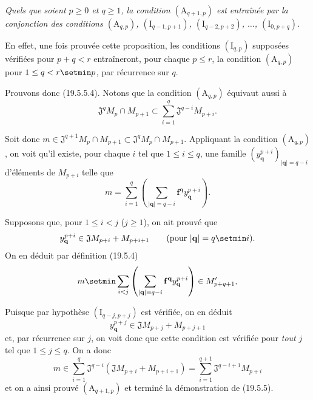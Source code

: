 \begin{env}[19.5.5.4]
\label{IV.19.5.5.4}
\emph{Quels que soient $p\geq0$ et $q\geq1$, la condition $(\mathrm A_{q+1,p})$ est entraînée par la conjonction des conditions $(\mathrm A_{q,p})$, $(\mathrm I_{q-1,p+1})$, $(\mathrm I_{q-2,p+2})$, $\ldots$, $(\mathrm I_{0,p+q})$.}

En effet, une fois prouvée cette proposition, les conditions $(\mathrm I_{q,p})$ supposées vérifiées pour $p+q<r$ entraîneront, pour chaque $p\leq r$, la condition $(\mathrm A_{q,p})$ pour $1\leq q<r\setmin p$, par récurrence sur $q$.

Prouvons donc (19.5.5.4). Notons que la condition $(\mathrm A_{q,p})$ équivaut aussi à
\begin{equation}
  \mathfrak J^qM_p\cap M_{p+1}\subset\sum_{i=1}^q\mathfrak J^{q-i}M_{p+i}.
  \tag{19.5.5.5}\label{IV.19.5.5.5}
\end{equation}

Soit donc $m\in\mathfrak J^{q+1}M_p\cap M_{p+1}\subset\mathfrak J^qM_p\cap M_{p+1}$. Appliquant la condition $(\mathrm A_{q,p})$, on voit qu'il existe, pour chaque $i$ tel que $1\leq i\leq q$, une famille $(y_{\mathbf q}^{p+i})_{|\mathbf q|=q-i}$ d'éléments de $M_{p+i}$ telle que
\[
  m=\sum_{i=1}^q\left(\sum_{|\mathbf q|=q-i}\mathbf f^{\mathbf q}y_{\mathbf q}^{p+i}\right).
\]

Supposons que, pour $1\leq i<j$ ($j\geq1$), on ait prouvé que
\[
  y_{\mathbf q}^{p+i}\in\mathfrak JM_{p+i}+M_{p+i+1}\qquad(\text{pour }|\mathbf q|=q\setmin i).
\]
On en déduit par définition (19.5.4)
\[
  m\setmin\sum_{i<j}\left(\sum_{|\mathbf q|=q-i}\mathbf f^{\mathbf q}y_{\mathbf q}^{p+i}\right)\in M_{p+q+1}',
\]

Puisque par hypothèse $(\mathrm I_{q-j,p+j})$ est vérifiée, on en déduit
\[
  y_{\mathbf q}^{p+j}\in\mathfrak JM_{p+j}+M_{p+j+1}
\]
et, par récurrence sur $j$, on voit donc que cette condition est vérifiée pour \emph{tout} $j$ tel que $1\leq j\leq q$. On a donc
\[
  m\in\sum_{i=1}^q\mathfrak J^{q-i}(\mathfrak JM_{p+i}+M_{p+i+1})=\sum_{i=1}^{q+1}\mathfrak J^{q-i+1}M_{p+i}
\]
et on a ainsi prouvé $(\mathrm A_{q+1,p})$ et terminé la démonstration de (19.5.5).
\end{env}

